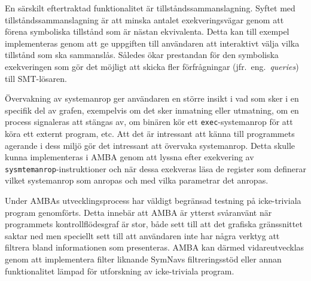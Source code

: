 En särskilt eftertraktad funktionalitet är tillståndssammanslagning. Syftet med
tillståndssammanslagning är att minska antalet exekveringsvägar genom att förena
symboliska tillstånd som är nästan ekvivalenta. Detta kan till exempel
implementeras genom att ge uppgiften till användaren att interaktivt välja vilka
tillstånd som ska sammanslås. Således ökar prestandan för den symboliska
exekveringen som gör det möjligt att skicka fler förfrågningar (jfr.\ eng.\
\emph{queries}) till SMT-lösaren.

Övervakning av systemanrop ger användaren en
större insikt i vad som sker i en specifik del av grafen, exempelvis om det sker
inmatning eller utmatning, om en process signaleras att stängas av, om binären
kör ett \texttt{exec}-systemanrop för att köra ett externt program, etc. Att det är
intressant att känna till programmets agerande i dess miljö gör det intressant
att övervaka systemanrop. Detta skulle kunna implementeras i AMBA genom att
lyssna efter exekvering av \texttt{sysmtemanrop}-instruktioner och när dessa
exekveras läsa de register som definerar vilket systemanrop som anropas och med
vilka parametrar det anropas.

Under AMBAs utvecklingsprocess har väldigt begränsad testning på icke-triviala
program genomförts. Detta innebär att AMBA är ytterst svåranvänt när programmets
kontrollflödesgraf är stor, både sett till att det grafiska gränssnittet saktar
ned men speciellt sett till att användaren inte har några verktyg att filtrera
bland informationen som presenteras. AMBA kan därmed vidareutvecklas genom att
implementera filter liknande SymNavs filtreringsstöd eller annan funktionalitet
lämpad för utforskning av icke-triviala program.
